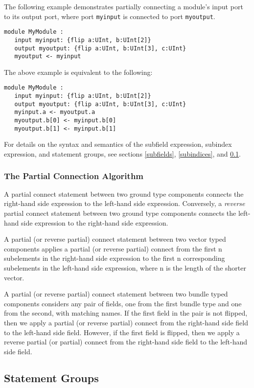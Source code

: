 \documentclass[12pt]{article}
\begin{document}
The following example demonstrates partially connecting a module's input port to its output port, where port \verb|myinput| is connected to port \verb|myoutput|.
\begin{verbatim}
module MyModule :
   input myinput: {flip a:UInt, b:UInt[2]}
   output myoutput: {flip a:UInt, b:UInt[3], c:UInt}
   myoutput <- myinput
\end{verbatim}

The above example is equivalent to the following:
\begin{verbatim}
module MyModule :
   input myinput: {flip a:UInt, b:UInt[2]}
   output myoutput: {flip a:UInt, b:UInt[3], c:UInt}
   myinput.a <- myoutput.a
   myoutput.b[0] <- myinput.b[0]
   myoutput.b[1] <- myinput.b[1]
\end{verbatim}
For details on the syntax and semantics of the subfield expression, subindex expression, and statement groups, see sections \ref{subfields}, \ref{subindices}, and \ref{statement_groups}.

\subsubsection{The Partial Connection Algorithm} \label{partial_connection_algorithm}

A partial connect statement between two ground type components connects the right-hand side expression to the left-hand side expression. Conversely, a {\em reverse} partial connect statement between two ground type components connects the left-hand side expression to the right-hand side expression. 

A partial (or reverse partial) connect statement between two vector typed components applies a partial (or reverse partial) connect from the first n subelements in the right-hand side expression to the first n corresponding subelements in the left-hand side expression, where n is the length of the shorter vector. 

A partial (or reverse partial) connect statement between two bundle typed components considers any pair of fields, one from the first bundle type and one from the second, with matching names. If the first field in the pair is not flipped, then we apply a partial (or reverse partial) connect from the right-hand side field to the left-hand side field. However, if the first field is flipped, then we apply a reverse partial (or partial) connect from the right-hand side field to the left-hand side field. 

\subsection{Statement Groups} \label{statement_groups}
\end{document}
